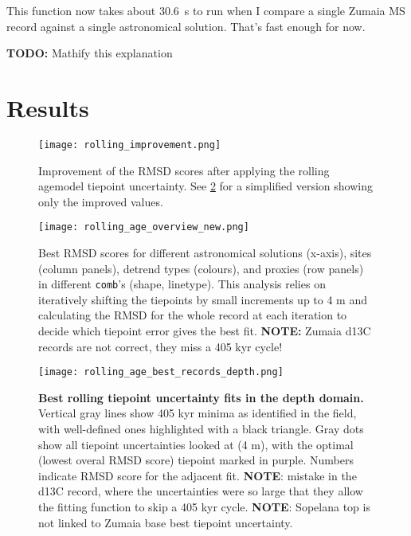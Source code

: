 \documentclass[draft]{agujournal2019}
\begin{document}
This function now takes about \qty{30.6}{\second} to run when I compare a single Zumaia MS record against a single astronomical solution. That's fast enough for now.

\textbf{TODO:} Mathify this explanation





\section{Results}\label{sec:results}

\begin{figure}[htb]
\centering
\texttt{[image: rolling\_improvement.png]}
\caption{\label{fig:rolling-improvement}
    Improvement of the RMSD scores after applying the rolling agemodel tiepoint uncertainty.
    See \cref{fig:rolling-rmsd} for a simplified version showing only the improved values.
}
\end{figure}

\begin{figure}[htb]
\centering
\texttt{[image: rolling\_age\_overview\_new.png]}
\caption{\label{fig:rolling-rmsd}
    Best \gls{RMSD} scores for different astronomical solutions (x-axis), sites (column panels), detrend types (colours), and proxies (row panels) in different \texttt{comb}'s (shape, linetype).
    This analysis relies on iteratively shifting the tiepoints by small increments up to \textpm{}4 m and calculating the \gls{RMSD} for the whole record at each iteration to decide which tiepoint error gives the best fit.
    \textbf{NOTE:} Zumaia \gls{d13C} records are not correct, they miss a 405 kyr cycle!
}
\end{figure}


\begin{figure}[htb]
\centering
\texttt{[image: rolling\_age\_best\_records\_depth.png]}
\caption{\label{fig:rolling-depth}
    \textbf{Best rolling tiepoint uncertainty fits in the depth domain.}
    Vertical gray lines show 405 kyr minima as identified in the field, with well-defined ones highlighted with a black triangle.
    Gray dots show all tiepoint uncertainties looked at (\textpm{}4 m), with the optimal (lowest overal \gls{RMSD} score) tiepoint marked in purple.
    Numbers indicate \gls{RMSD} score for the adjacent fit.
    \textbf{NOTE}: mistake in the \gls{d13C} record, where the uncertainties were so large that they allow the fitting function to skip a 405 kyr cycle.
    \textbf{NOTE}: Sopelana top is not linked to Zumaia base best tiepoint uncertainty.
}
\end{figure}
\end{document}
